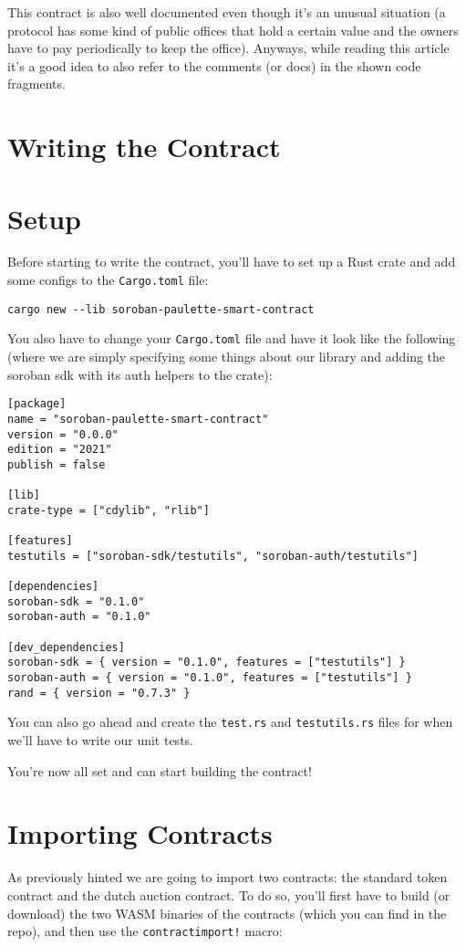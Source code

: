 \documentclass[10pt]{article}
\begin{document}
This contract is also well documented even though it's an unusual situation (a protocol has some kind of public offices that hold a certain value and the owners have to pay periodically to keep the office). Anyways, while reading this article it's a good idea to also refer to the comments (or docs) in the shown code fragments.

\section*{Writing the Contract}

\section*{Setup}
Before starting to write the contract, you'll have to set up a Rust crate and add some configs to the \texttt{Cargo.toml} file:

\begin{verbatim}
cargo new --lib soroban-paulette-smart-contract
\end{verbatim}

You also have to change your \texttt{Cargo.toml} file and have it look like the following (where we are simply specifying some things about our library and adding the soroban sdk with its auth helpers to the crate):

\begin{verbatim}
[package]
name = "soroban-paulette-smart-contract"
version = "0.0.0"
edition = "2021"
publish = false

[lib]
crate-type = ["cdylib", "rlib"]

[features]
testutils = ["soroban-sdk/testutils", "soroban-auth/testutils"]

[dependencies]
soroban-sdk = "0.1.0"
soroban-auth = "0.1.0"

[dev_dependencies]
soroban-sdk = { version = "0.1.0", features = ["testutils"] }
soroban-auth = { version = "0.1.0", features = ["testutils"] }
rand = { version = "0.7.3" }
\end{verbatim}

You can also go ahead and create the \texttt{test.rs} and \texttt{testutils.rs} files for when we'll have to write our unit tests.

You're now all set and can start building the contract!

\section*{Importing Contracts}
As previously hinted we are going to import two contracts: the standard token contract and the dutch auction contract. To do so, you'll first have to build (or download) the two WASM binaries of the contracts (which you can find in the repo), and then use the \texttt{contractimport!} macro:
\end{document}
